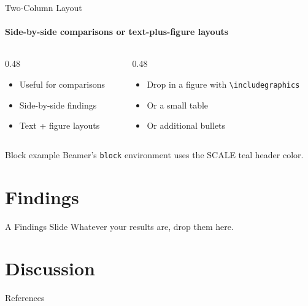 \documentclass[aspectratio=169,t]{beamer}
\begin{document}
\begin{frame}[fragile]{Two-Column Layout}
  \framesubtitle{Side-by-side comparisons or text-plus-figure layouts}

  \begin{columns}[T,onlytextwidth]
    \begin{column}{0.48\textwidth}
      \textbf{}
      \begin{itemize}
        \item Useful for comparisons
        \item Side-by-side findings
        \item Text + figure layouts
      \end{itemize}
    \end{column}
    \begin{column}{0.48\textwidth}
      \textbf{}
      \begin{itemize}
        \item Drop in a figure with
              \verb|\includegraphics|
        \item Or a small table
        \item Or additional bullets
      \end{itemize}
    \end{column}
  \end{columns}

  \vspace{0.6em}
  \begin{block}{Block example}
    Beamer's \texttt{block} environment uses the SCALE teal header color.
  \end{block}
\end{frame}

\section{Findings}
\roadmapframe

\begin{frame}{A Findings Slide}
  Whatever your results are, drop them here.
\end{frame}

\section{Discussion}
\roadmapframe


\begin{frame}[allowframebreaks]{References}
  \nocite{*} %
  \printbibliography[heading=none]
\end{frame}
\end{document}
